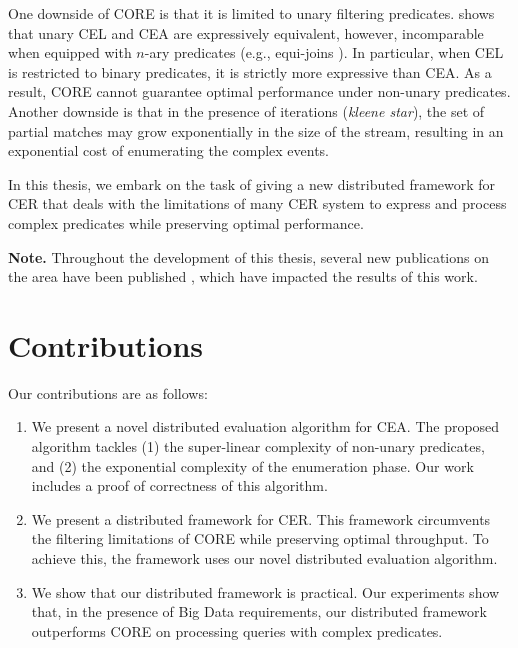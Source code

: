 One downside of CORE is that it is limited to unary filtering predicates. \cite{on-the-expressiveness} shows that unary CEL and CEA are expressively equivalent, however, incomparable when equipped with $n$-ary predicates (e.g., equi-joins ). In particular, when CEL is restricted to binary predicates, it is strictly more expressive than CEA. As a result, CORE cannot guarantee optimal performance under non-unary predicates. Another downside is that in the presence of iterations (\emph{kleene star}), the set of partial matches may grow exponentially in the size of the stream, resulting in an exponential cost of enumerating the complex events.

In this thesis, we embark on the task of giving a new distributed framework for CER that deals with the limitations of many CER system to express and process complex predicates while preserving optimal performance.

\textbf{Note.} Throughout the development of this thesis, several new publications on the area have been published \cite{formal-framework-cer, core}, which have impacted the results of this work.

\section{Contributions}
\label{sec:contribution}

Our contributions are as follows:

\begin{enumerate}[label=(\roman*)]
  \item We present a novel distributed evaluation algorithm for CEA. The proposed algorithm tackles (1) the super-linear complexity of non-unary predicates, and (2) the exponential complexity of the enumeration phase. Our work includes a proof of correctness of this algorithm.

  \item We present a distributed framework for CER. This framework circumvents the filtering limitations of CORE while preserving optimal throughput. To achieve this, the framework uses our novel distributed evaluation algorithm.

  \item We show that our distributed framework is practical. Our experiments show that, in the presence of Big Data requirements, our distributed framework outperforms CORE on processing queries with complex predicates.
\end{enumerate}

